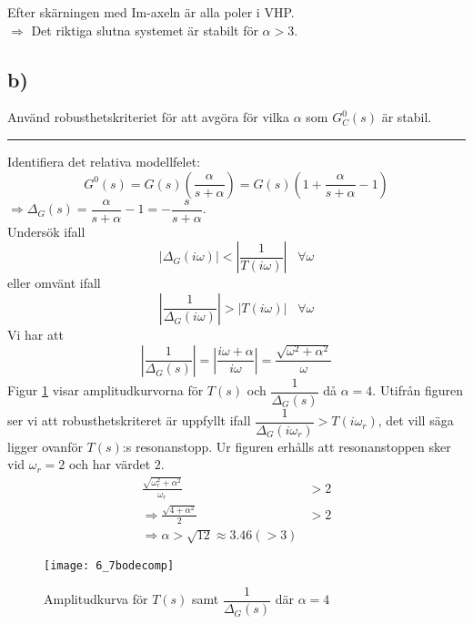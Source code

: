 \documentclass[12pt]{article}
\newcommand{\qline}{\hrule \vspace*{10pt}}
\begin{document}
Efter skärningen med Im-axeln är alla poler i VHP. \\
$\Rightarrow$ Det riktiga slutna systemet är stabilt för $\alpha > 3$.

\subsection*{b)}
Använd robusthetskriteriet för att avgöra för vilka $\alpha$ som $G_C^0(s)$ är stabil.\vspace*{2pt}
\qline
Identifiera det relativa modellfelet:
\begin{equation*}
  G^0(s) = G(s)\left(\frac{\alpha}{s + \alpha}\right) = G(s)
  \left(
    1 + \frac{\alpha}{s + \alpha} - 1
  \right)
\end{equation*}
$\Rightarrow \Delta_G(s) = \dfrac{\alpha}{s + \alpha} - 1 = -\dfrac{s}{s+\alpha}$. \\

Undersök ifall 
\begin{equation*}
  |\Delta_G(i\omega)| < 
\left|
  \frac{1}{T(i\omega)}
\right| \;\;\; \forall \omega
\end{equation*}
eller omvänt ifall
\begin{equation*}
  \left|
    \frac{1}{\Delta_G(i\omega)} \right| > |T(i\omega)| \;\;\; \forall \omega
\end{equation*}
Vi har att
\begin{equation*}
  \left|
    \frac{1}{\Delta_G(s)}
  \right| = 
  \left|
    \frac{i\omega + \alpha}{i\omega}
  \right| = \frac{\sqrt{\omega^2+\alpha^2}}{\omega}
\end{equation*}
Figur \ref{fig:67bodecomp} visar amplitudkurvorna för $T(s)$ och $\dfrac{1}{\Delta_G(s)}$ då $\alpha = 4$. Utifrån figuren ser vi att robusthetskriteret är uppfyllt ifall $\dfrac{1}{\Delta_G(i\omega_r)} > T(i\omega_r)$, det vill säga ligger ovanför $T(s)$:s resonanstopp. Ur figuren erhålls att resonanstoppen sker vid $\omega_r = 2$ och har värdet $2$.
\begin{align*}
  \frac{\sqrt{\omega_r^2 + \alpha^2}}{\omega_r} &> 2 \\
  \Rightarrow \frac{\sqrt{4 + \alpha^2}}{2} &> 2 \\
  \Rightarrow \alpha > \sqrt{12} \approx 3.46 (> 3)
\end{align*}

\begin{figure}[h!]
  \centering
  \texttt{[image: 6\_7bodecomp]}
  \caption{Amplitudkurva för $T(s)$ samt $\dfrac{1}{\Delta_G(s)}$ där $\alpha = 4$}
  \label{fig:67bodecomp}
\end{figure}
\FloatBarrier
\end{document}
